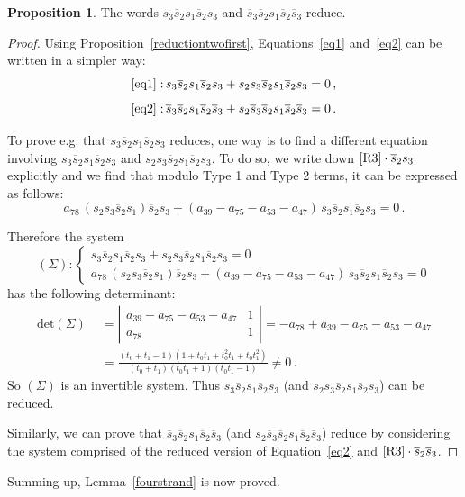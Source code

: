 \documentclass[12pt,reqno]{amsart}
\theoremstyle{definition}
\newtheorem{proposition}[theorem]{Proposition}
\def\be{\begin{equation}}
\def\ee{\end{equation}}
\def\hs{\overline{s}}
\begin{document}
\begin{proposition}
The words $s_{3} \hs_2 s_1 \hs_2 s_{3}$ and $\hs_{3} \hs_2 s_1 \hs_2 \hs_{3}$ reduce.
\end{proposition}

\begin{proof}
Using Proposition~\ref{reductiontwofirst}, Equations~\eqref{eq1} and~\eqref{eq2}
can be written in a simpler way: 
$$
{\eqref{eq1} : }\,s_3 \hs_2 s_1 \hs_2 s_3 + s_2 s_3 \hs_2 s_1 \hs_2 s_3 = 0 \, ,
$$
$$
{\eqref{eq2} : }\,\hs_3 \hs_2 s_1 \hs_2\hs_3 + s_2 \hs_3 \hs_2 s_1 \hs_2 \hs_3 = 0 \,.
$$

To prove e.g. that $s_3 \hs_2 s_1 \hs_2 s_3$ reduces, one way is to find a
different equation involving $s_3 \hs_2 s_1 \hs_2 s_3$ and $s_2 s_3 \hs_2
s_1 \hs_2 s_3$. To do so, we write down $\eqref{R3} \cdot \hs_2 s_3$ explicitly
and we find that modulo Type 1 and Type 2 terms, it can be expressed as follows:
\be
\label{eq4}
a_{78} \, (s_2 s_3 \hs_2 s_1) \hs_2 s_3 + (a_{39} - a_{75} - a_{53}
- a_{47}) \, s_3 \hs_2 s_1 \hs_2 s_3 = 0 \,.
\ee

Therefore the system
$$
(\Sigma): \left\{
\begin{array}{l}
s_3 \hs_2 s_1 \hs_2 s_3 + s_2 s_3 \hs_2 s_1 \hs_2 s_3 = 0 \\
a_{78} \, (s_2 s_3 \hs_2 s_1) \hs_2 s_3 + (a_{39} - a_{75} - a_{53} - a_{47}) \,
s_3 \hs_2 s_1 \hs_2 s_3 = 0
\end{array}
\right.
$$
has the following determinant:
\begin{align*}
   \text{det}(\Sigma)&\phantom{i}   =\left|
\begin{array}{cc}
a_{39} - a_{75} - a_{53} - a_{47}&1\\
a_{78}&1
\end{array}
\right| = - a_{78} + a_{39} - a_{75} - a_{53} - a_{47}\\
& \phantom{i}  = \frac{(t_0 + t_1 -1)(1 + t_0 t_1 + t_0^2 t_1
  + t_0 t_1^2)}{(t_0 + t_1)(t_0 t_1 +1)(t_0 t_1 -1)} \neq 0 \,.
\end{align*}
So $(\Sigma)$ is an invertible system. Thus $s_3 \hs_2 s_1 \hs_2 s_3$ (and
$s_2 s_3 \hs_2 s_1 \hs_2 s_3$) can be reduced.

Similarly, we can prove that $\hs_3 \hs_2 s_1 \hs_2\hs_3$ (and $s_2 \hs_3
\hs_2 s_1 \hs_2 \hs_3$) reduce by considering the system comprised of the
reduced version of Equation~\eqref{eq2} and $\eqref{R3} \cdot \hs_2 \hs_3$.
\end{proof}

Summing up, Lemma~\ref{fourstrand} is now proved.



%

\end{document}
